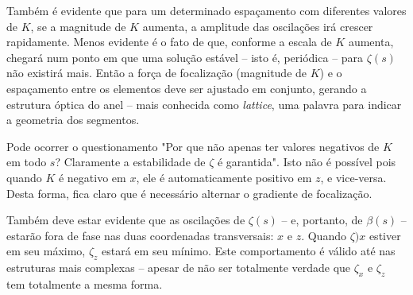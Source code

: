 Também é evidente que para um determinado espaçamento com diferentes valores de $K$, se a magnitude de $K$ aumenta, a amplitude das oscilações irá crescer rapidamente. Menos evidente é o fato de que, conforme a escala de $K$ aumenta, chegará num ponto em que uma solução estável -- isto é, periódica -- para $\zeta(s)$ não existirá mais. Então a força de focalização (magnitude de $K$) e o espaçamento entre os elementos deve ser ajustado em conjunto, gerando a estrutura óptica do anel -- mais conhecida como \textit{lattice}, uma palavra para indicar a geometria dos segmentos.

Pode ocorrer o questionamento "Por que não apenas ter valores negativos de $K$ em todo $s$? Claramente a estabilidade de $\zeta$ é garantida". Isto não é possível pois quando $K$ é negativo em $x$, ele é automaticamente positivo em $z$, e vice-versa. Desta forma, fica claro que é necessário alternar o gradiente de focalização.

Também deve estar evidente que as oscilações de $\zeta(s)$ -- e, portanto, de $\beta(s)$ -- estarão fora de fase nas duas coordenadas transversais: $x$ e $z$. Quando $\zeta)x$ estiver em seu máximo, $\zeta_z$ estará em seu mínimo. Este comportamento é válido até nas estruturas mais complexas -- apesar de não ser totalmente verdade que $\zeta_x$ e $\zeta_z$ tem totalmente a mesma forma. 


